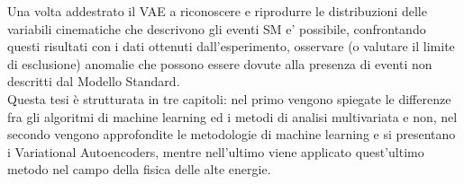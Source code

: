 Una volta addestrato il VAE a riconoscere e riprodurre le distribuzioni delle variabili cinematiche che descrivono gli eventi SM e' possibile, confrontando questi risultati con i dati ottenuti dall'esperimento, osservare (o valutare il limite di esclusione) anomalie che possono essere dovute alla presenza di eventi non descritti dal Modello Standard.\\
Questa tesi è strutturata in tre capitoli: nel primo vengono spiegate le differenze fra gli algoritmi di machine learning ed i metodi di analisi multivariata e non, nel secondo vengono approfondite le metodologie di machine learning e si presentano i Variational Autoencoders, mentre nell'ultimo viene applicato quest'ultimo metodo nel campo della fisica delle alte energie.


\newpage






	


